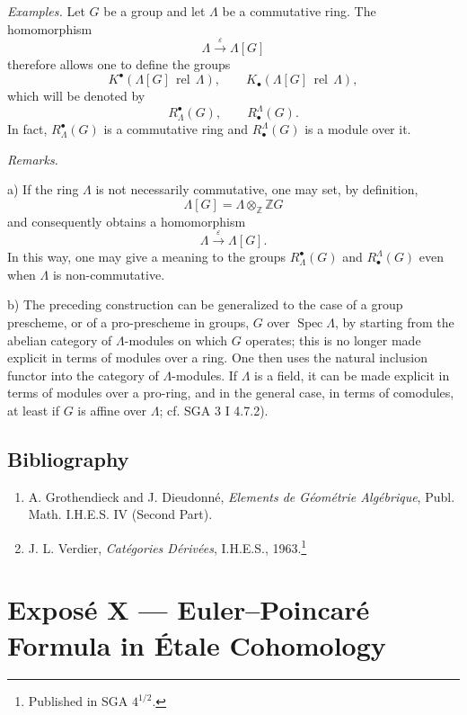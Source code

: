 \documentclass[11pt]{article}
\DeclareMathOperator{\Spec}{Spec}
\providecommand{\Spec}{\operatorname{Spec}}
\providecommand{\Spec}{\operatorname{Spec}}
\providecommand{\Spec}{\operatorname{Spec}}
\providecommand{\Spec}{\operatorname{Spec}}
\begin{document}
\emph{Examples.} Let $G$ be a group and let $\Lambda$ be a commutative ring. The homomorphism
\[
\Lambda\xrightarrow{\varepsilon}\Lambda[G]
\]
therefore allows one to define the groups
\[
K^\bullet(\Lambda[G]\operatorname{\,rel\,}\Lambda),\qquad
K_\bullet(\Lambda[G]\operatorname{\,rel\,}\Lambda),
\]
which will be denoted by
\[
R^\bullet_\Lambda(G),\qquad R^\Lambda_\bullet(G).
\]
In fact, $R^\bullet_\Lambda(G)$ is a commutative ring and $R^\Lambda_\bullet(G)$ is a module over it.

\emph{Remarks.}

a) If the ring $\Lambda$ is not necessarily commutative, one may set, by definition,
\[
\Lambda[G]=\Lambda\otimes_{\mathbb Z}\mathbb ZG
\]
and consequently obtains a homomorphism
\[
\Lambda\xrightarrow{\varepsilon}\Lambda[G].
\]
In this way, one may give a meaning to the groups $R^\bullet_\Lambda(G)$ and $R^\Lambda_\bullet(G)$ even when $\Lambda$ is non-commutative.

b) The preceding construction can be generalized to the case of a group prescheme, or of a pro-prescheme in groups, $G$ over $\Spec\Lambda$, by starting from the abelian category of $\Lambda$-modules on which $G$ operates; this is no longer made explicit in terms of modules over a ring. One then uses the natural inclusion functor into the category of $\Lambda$-modules. If $\Lambda$ is a field, it can be made explicit in terms of modules over a pro-ring, and in the general case, in terms of comodules, at least if $G$ is affine over $\Lambda$; cf. SGA 3 I 4.7.2).

\subsection*{Bibliography}

\begin{enumerate}
\item[{[1]}] A. Grothendieck and J. Dieudonné, \emph{Elements de Géométrie Algébrique}, Publ. Math. I.H.E.S. IV (Second Part).
\item[{[2]}] J. L. Verdier, \emph{Catégories Dérivées}, I.H.E.S., 1963.\footnote{Published in SGA $4^{1/2}$.}
\end{enumerate}

\section*{Exposé X --- Euler--Poincaré Formula in Étale Cohomology}
\end{document}
